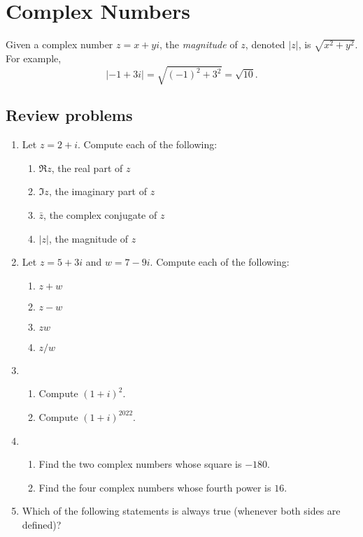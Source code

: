 \section{Complex Numbers}

Given a complex number $z = x + yi$, the \emph{magnitude} of $z$, denoted $\lvert z\rvert$, is $\sqrt{x^2 + y^2}$. For example,
\begin{equation*}
\lvert -1 + 3i\rvert = \sqrt{(-1)^2 + 3^2} = \sqrt{10}.
\end{equation*}

\subsection{Review problems}

\begin{enumerate}
\item Let $z = 2 + i$. Compute each of the following:
\begin{enumerate}
\item $\Re z$, the real part of $z$
\item $\Im z$, the imaginary part of $z$
\item $\bar{z}$, the complex conjugate of $z$
\item $\lvert z\rvert$, the magnitude of $z$
\end{enumerate}
\item Let $z = 5 + 3i$ and $w = 7 - 9i$. Compute each of the following:
\begin{enumerate}
\item $z + w$
\item $z - w$
\item $zw$
\item $z/w$
\end{enumerate}
\item \begin{enumerate}
\item Compute $(1 + i)^2$.
\item Compute $(1 + i)^{2022}$.
\end{enumerate}
\item \begin{enumerate}
\item Find the two complex numbers whose square is $-180$.
\item Find the four complex numbers whose fourth power is $16$.
\end{enumerate}
\item Which of the following statements is always true (whenever both sides are defined)?

\end{enumerate}
